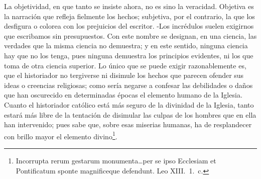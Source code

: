\raggedbottom{} \documentclass[12pt, a4paper, openany]{book} %
\begin{document}
La objetividad, en que tanto se insiste ahora, no es sino la veracidad. Objetiva es la narración que refleja fielmente los hechos; subjetiva, por el contrario, la que los desfigura o colorea con los prejuicios del escritor. -Los incrédulos suelen exigirnos que escribamos sin presupuestos. Con este nombre se designan, en una ciencia, las verdades que la misma ciencia no demuestra; y en este sentido, ninguna ciencia hay que no los tenga, pues ninguna demuestra los principios evidentes, ni los que toma de otra ciencia superior. Lo único que se puede exigir razonablemente es, que el historiador no tergiverse ni disimule los hechos que parecen ofender sus ideas o creencias religiosas; como sería negarse a confesar las debilidades o daños que han oscurecido en determinadas épocas el elemento humano de la Iglesia. Cuanto el historiador católico está más seguro de la divinidad de la Iglesia, tanto estará más libre de la tentación de disimular las culpas de los hombres que en ella han intervenido; pues sabe que, sobre esas miserias humanas, ha de resplandecer con brillo mayor el elemento divino\textdagger\footnote{Incorrupta rerum gestarum monumenta\ldots per se ipso Ecclesiam et Pontificatum sponte magnificeque defendunt. Leo XIII.\ 1.\ c.}.
\end{document}
